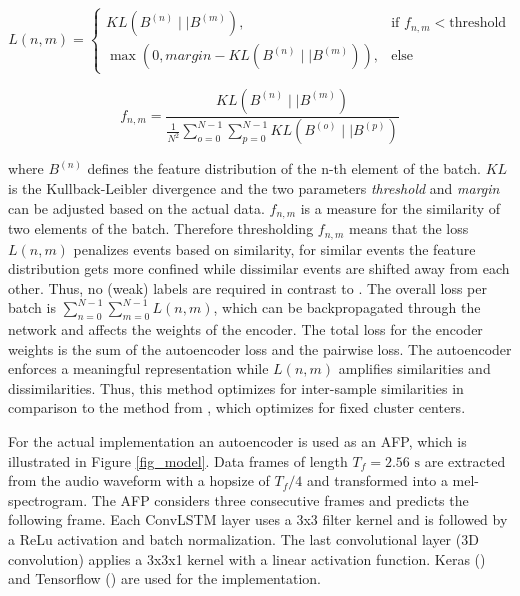 \documentclass{article} %
\begin{document}
\begin{equation}
L(n,m) = 
\begin{cases}
\mathit{KL}(B^{(n)} \mid\mid B^{(m)}), & \text{if } f_{n,m} < \text{threshold} \\
\max( 0, \mathit{margin} -KL(B^{(n)} \mid\mid B^{(m)})), & \text{else}
\end{cases}
\end{equation}


\begin{equation}
f_{ n,m } = \frac{{KL(B^{(n)} \mid\mid B^{(m)})}}  {\frac{1}{N^2}{\sum_{o=0}^{N-1} \sum_{p=0}^{N-1} KL(B^{(o)} \mid\mid B^{(p)})}} 
\end{equation}

where $B^{(n)}$ defines the feature distribution of the n-th element of the batch. $KL$ is the Kullback-Leibler divergence and the two parameters \emph{threshold} and \emph{margin} can be adjusted based on the actual data. $f_{n,m}$ is a measure for the similarity of two elements of the batch. Therefore thresholding $f_{n,m}$ means that the loss $L(n,m)$ penalizes events based on similarity, for similar events the feature distribution gets more confined while dissimilar events are shifted away from each other. Thus, no (weak) labels are required in contrast to \cite{hsu_neural_2015}. The overall loss per batch is $\sum_{n=0}^{N-1} \sum_{m=0}^{N-1} L(n,m)$, which can be backpropagated through the network and affects the weights of the encoder. The total loss for the encoder weights is the sum of the autoencoder loss and the pairwise loss. The autoencoder enforces a meaningful representation while $L(n,m)$ amplifies similarities and dissimilarities. Thus, this method optimizes for inter-sample similarities in comparison to the method from \cite{xie_unsupervised_2016}, which optimizes for fixed cluster centers.

For the actual implementation an autoencoder is used as an AFP, which is illustrated in Figure \ref{fig_model}. Data frames of length $T_f=2.56\text{ s}$ are extracted from the audio waveform with a hopsize of $T_f/4$ and transformed into a mel-spectrogram. The AFP considers three consecutive frames and predicts the following frame.
Each ConvLSTM layer uses a 3x3 filter kernel and is followed by a ReLu activation and batch normalization. The last convolutional layer (3D convolution) applies a 3x3x1 kernel with a linear activation function. Keras (\cite{chollet_keras_2015}) and Tensorflow (\cite{martin_abadi_tensorflow:_2015}) are used for the implementation.
\end{document}
